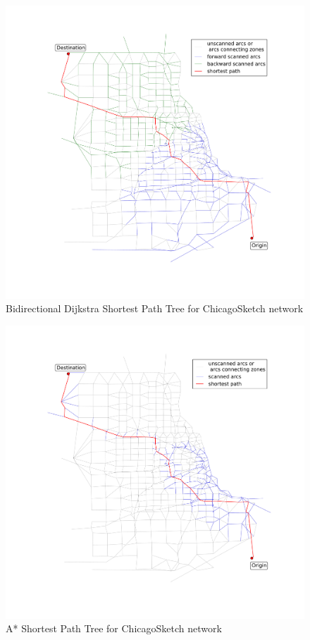 \begin{figure}
    \includegraphics[width=\textwidth,trim=120px 120px 48px 120px,clip]{img/chicago_bidirect}
    \caption{Bidirectional Dijkstra Shortest Path Tree for ChicagoSketch network}
    \label{fig:astarchicago}
\end{figure}

\begin{figure}
    \includegraphics[width=\textwidth,trim=120px 120px 48px 120px,clip]{img/chicago_astar}
    \caption{A* Shortest Path Tree for ChicagoSketch network}
    \label{fig:astarchicago}
\end{figure}
